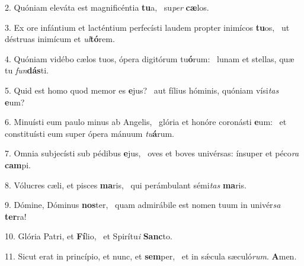 2. Quóniam eleváta est magnificéntia \textbf{tu}a, \ast\  su\textit{per} \textbf{cæ}los.\

3. Ex ore infántium et lacténtium perfecísti laudem propter inimícos \textbf{tu}os, \ast\  ut déstruas inimícum et \textit{ul}\textbf{tó}rem.\

4. Quóniam vidébo cælos tuos, ópera digitórum tu\textbf{ó}rum: \ast\  lunam et stellas, quæ tu \textit{fun}\textbf{dás}ti.\

5. Quid est homo quod memor es \textbf{e}jus? \ast\  aut fílius hóminis, quóniam vísi\textit{tas} \textbf{e}um?\

6. Minuísti eum paulo minus ab Angelis, \dag\  glória et honóre coronásti \textbf{e}um: \ast\  et constituísti eum super ópera mánuum \textit{tu}\textbf{á}rum.\

7. Omnia subjecísti sub pédibus \textbf{e}jus, \ast\  oves et boves univérsas: ínsuper et péco\textit{ra} \textbf{cam}pi.\

8. Vólucres cæli, et pisces \textbf{ma}ris, \ast\  qui perámbulant sémi\textit{tas} \textbf{ma}ris.\

9. Dómine, Dóminus \textbf{nos}ter, \ast\  quam admirábile est nomen tuum in univér\textit{sa} \textbf{ter}ra!\

10. Glória Patri, et \textbf{Fí}lio, \ast\  et Spirítu\textit{i} \textbf{Sanc}to.\

11. Sicut erat in princípio, et nunc, et \textbf{sem}per, \ast\  et in sǽcula sæculó\textit{rum}. \textbf{A}men.\

